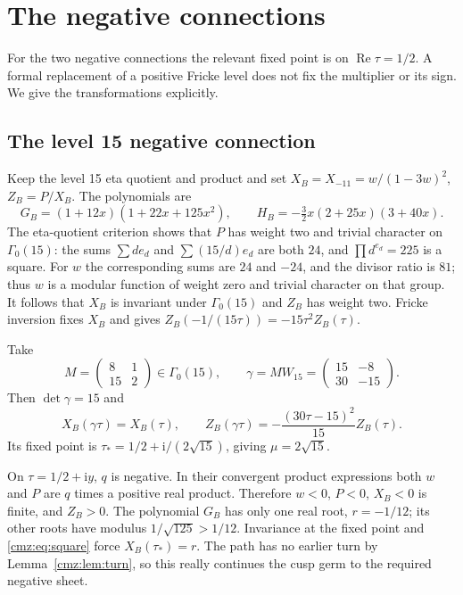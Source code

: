 \documentclass[11pt,letterpaper]{article}
\numberwithin{equation}{section}
\theoremstyle{definition}\newtheorem{definition}[theorem]{Definition}
\theoremstyle{remark}\newtheorem{remark}[theorem]{Remark}
\newcommand{\ii}{\mathrm i}
\DeclareMathOperator{\Rea}{Re}
\begin{document}
\section{The negative connections}
\label{cmz:sec:negative}
For the two negative connections the relevant fixed point is on $\Rea\tau=1/2$. A formal replacement of a positive Fricke level does not fix the multiplier or its sign. We give the transformations explicitly.

\subsection{The level 15 negative connection}
Keep the level 15 eta quotient and product and set $X_B=X_{-11}=w/(1-3w)^2$, $Z_B=P/X_B$. The polynomials are
\[
G_B=(1+12x)(1+22x+125x^2),\qquad
H_B=-\tfrac32x(2+25x)(3+40x).
\]
The eta-quotient criterion shows that $P$ has weight two and trivial character on $\Gamma_0(15)$: the sums $\sum d e_d$ and $\sum (15/d)e_d$ are both $24$, and $\prod d^{e_d}=225$ is a square. For $w$ the corresponding sums are $24$ and $-24$, and the divisor ratio is $81$; thus $w$ is a modular function of weight zero and trivial character on that group. It follows that $X_B$ is invariant under $\Gamma_0(15)$ and $Z_B$ has weight two. Fricke inversion fixes $X_B$ and gives $Z_B(-1/(15\tau))=-15\tau^2Z_B(\tau)$.

Take
\begin{equation}
M=\begin{pmatrix}8&1\\15&2\end{pmatrix}\in\Gamma_0(15),\qquad
\gamma=MW_{15}=\begin{pmatrix}15&-8\\30&-15\end{pmatrix}.
\label{cmz:eq:gamma15}
\end{equation}
Then $\det\gamma=15$ and
\begin{equation}
X_B(\gamma\tau)=X_B(\tau),\qquad
Z_B(\gamma\tau)=-\frac{(30\tau-15)^2}{15}Z_B(\tau).
\label{cmz:eq:law15}
\end{equation}
Its fixed point is $\tau_*=1/2+\ii/(2\sqrt{15})$, giving $\mu=2\sqrt{15}$.

On $\tau=1/2+\ii y$, $q$ is negative. In their convergent product expressions both $w$ and $P$ are $q$ times a positive real product. Therefore $w<0$, $P<0$, $X_B<0$ is finite, and $Z_B>0$. The polynomial $G_B$ has only one real root, $r=-1/12$; its other roots have modulus $1/\sqrt{125}>1/12$. Invariance at the fixed point and \eqref{cmz:eq:square} force $X_B(\tau_*)=r$. The path has no earlier turn by Lemma~\ref{cmz:lem:turn}, so this really continues the cusp germ to the required negative sheet.
\end{document}
